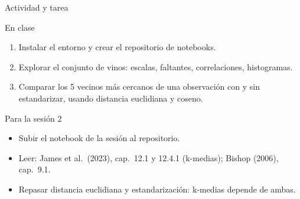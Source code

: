 \begin{frame}{Actividad y tarea}
  \begin{block}{En clase}
    \begin{enumerate}
      \item Instalar el entorno y crear el repositorio de notebooks.
      \item Explorar el conjunto de vinos: escalas, faltantes, correlaciones, histogramas.
      \item Comparar los 5 vecinos más cercanos de una observación con y sin estandarizar, usando distancia euclidiana y coseno.
    \end{enumerate}
  \end{block}
  \begin{exampleblock}{Para la sesión 2}
    \begin{itemize}
      \item Subir el notebook de la sesión al repositorio.
      \item Leer: James et al.\ (2023), cap.~12.1 y 12.4.1 (k-medias); Bishop (2006), cap.~9.1.
      \item Repasar distancia euclidiana y estandarización: k-medias depende de ambas.
    \end{itemize}
  \end{exampleblock}
\end{frame}
